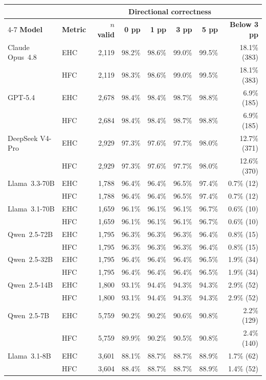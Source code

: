 \begin{tabular}{llrrrrrr}
\toprule
& & & \multicolumn{4}{c}{Directional correctness} & \\
\cmidrule(lr){4-7}
\textbf{Model} & \textbf{Metric} & \textbf{$n$ valid} &
\textbf{0 pp} & \textbf{1 pp} & \textbf{3 pp} & \textbf{5 pp} &
\textbf{Below 3 pp} \\
\midrule
Claude Opus~4.8 & EHC & 2,119 & 98.2\% & 98.6\% & 99.0\% & 99.5\% & 18.1\% (383) \\
 & HFC & 2,119 & 98.3\% & 98.6\% & 99.0\% & 99.5\% & 18.1\% (383) \\
GPT-5.4 & EHC & 2,678 & 98.4\% & 98.4\% & 98.7\% & 98.8\% & 6.9\% (185) \\
 & HFC & 2,684 & 98.4\% & 98.4\% & 98.7\% & 98.8\% & 6.9\% (185) \\
DeepSeek V4-Pro & EHC & 2,929 & 97.3\% & 97.6\% & 97.7\% & 98.0\% & 12.7\% (371) \\
 & HFC & 2,929 & 97.3\% & 97.6\% & 97.7\% & 98.0\% & 12.6\% (370) \\
\midrule
Llama~3.3-70B & EHC & 1,788 & 96.4\% & 96.4\% & 96.5\% & 97.4\% & 0.7\% (12) \\
 & HFC & 1,788 & 96.4\% & 96.4\% & 96.5\% & 97.4\% & 0.7\% (12) \\
Llama~3.1-70B & EHC & 1,659 & 96.1\% & 96.1\% & 96.1\% & 96.7\% & 0.6\% (10) \\
 & HFC & 1,659 & 96.1\% & 96.1\% & 96.1\% & 96.7\% & 0.6\% (10) \\
Qwen~2.5-72B & EHC & 1,795 & 96.3\% & 96.3\% & 96.3\% & 96.4\% & 0.8\% (15) \\
 & HFC & 1,795 & 96.3\% & 96.3\% & 96.3\% & 96.4\% & 0.8\% (15) \\
Qwen~2.5-32B & EHC & 1,795 & 96.4\% & 96.4\% & 96.4\% & 96.5\% & 1.9\% (34) \\
 & HFC & 1,795 & 96.4\% & 96.4\% & 96.4\% & 96.5\% & 1.9\% (34) \\
Qwen~2.5-14B & EHC & 1,800 & 93.1\% & 94.4\% & 94.3\% & 94.3\% & 2.9\% (52) \\
 & HFC & 1,800 & 93.1\% & 94.4\% & 94.3\% & 94.3\% & 2.9\% (52) \\
Qwen~2.5-7B & EHC & 5,759 & 90.2\% & 90.2\% & 90.6\% & 90.8\% & 2.2\% (129) \\
 & HFC & 5,759 & 89.9\% & 90.2\% & 90.5\% & 90.8\% & 2.4\% (140) \\
Llama~3.1-8B & EHC & 3,601 & 88.1\% & 88.7\% & 88.7\% & 88.9\% & 1.7\% (62) \\
 & HFC & 3,604 & 88.4\% & 88.7\% & 88.7\% & 88.9\% & 1.4\% (52) \\
\bottomrule
\end{tabular}
